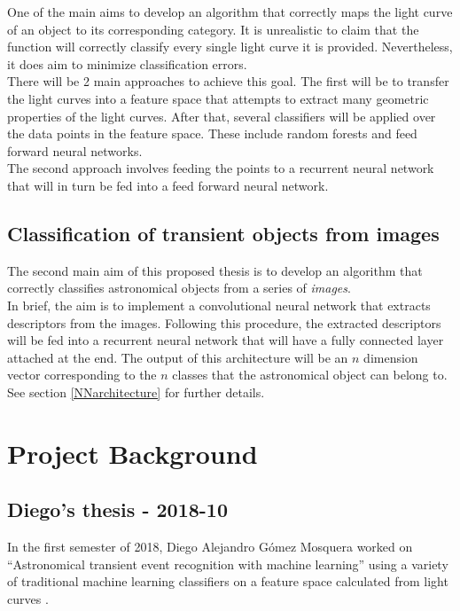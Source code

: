 One of the main aims to develop an algorithm that correctly maps the light curve of an object to its corresponding category. It is unrealistic to claim that the function will correctly classify every single light curve it is provided. Nevertheless, it does aim to minimize classification errors. \\

There will be 2 main approaches to achieve this goal. The first will be to transfer the light curves into a feature space that attempts to extract many geometric properties of the light curves. After that, several classifiers will be applied over the data points in the feature space. These include random forests and feed forward neural networks.\\

The second approach involves feeding the points to a recurrent neural network that will in turn be fed into a feed forward neural network. 

\subsection{Classification of transient objects from images}

The second main aim of this proposed thesis is to develop an algorithm that correctly classifies astronomical objects from a series of \textit{images}. \\

In brief, the aim is to implement a convolutional neural network that extracts descriptors from the images. Following this procedure, the extracted descriptors will be fed into a recurrent neural network that will have a fully connected layer attached at the end. The output of this architecture will be an $n$ dimension vector corresponding to the $n$ classes that the astronomical object can belong to. See section \ref{NNarchitecture} for further details.\\

\section{Project Background}

\subsection{Diego's thesis - 2018-10}

In the first semester of 2018, Diego Alejandro G\'omez Mosquera worked on ``Astronomical transient event recognition with machine learning'' using a variety of traditional machine learning classifiers on a feature space calculated from light curves \cite{diegoThesis}.\\ 

